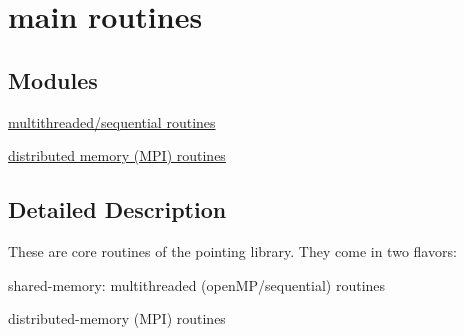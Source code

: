 \hypertarget{group__matmap__group12}{\section{main routines}
\label{group__matmap__group12}
}
\subsection*{Modules}
\begin{DoxyCompactItemize}
\item 
\hyperlink{group__matmap__group12a}{multithreaded/sequential routines}
\item 
\hyperlink{group__matmap__group12b}{distributed memory (\-M\-P\-I) routines}
\end{DoxyCompactItemize}


\subsection{Detailed Description}
These are core routines of the pointing library. They come in two flavors\-:
\begin{DoxyItemize}
\item shared-\/memory\-: multithreaded (open\-M\-P/sequential) routines
\item distributed-\/memory (M\-P\-I) routines 
\end{DoxyItemize}